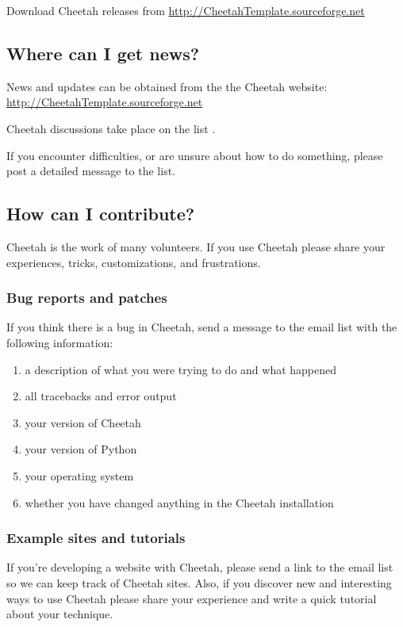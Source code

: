 Download Cheetah releases from
\url{http://CheetahTemplate.sourceforge.net}

\subsection{Where can I get news?}
\label{intro.news}

News and updates can be obtained from the the Cheetah website:
\url{http://CheetahTemplate.sourceforge.net}

Cheetah discussions take place on the list
.

If you encounter difficulties, or are unsure about how to do something,
please post a detailed message to the list.

\subsection{How can I contribute?}
\label{intro.contribute}

Cheetah is the work of many volunteers.  If you use Cheetah please share your
experiences, tricks, customizations, and frustrations.

\subsubsection{Bug reports and patches}

If you think there is a bug in Cheetah, send a message to the email list
with the following information:

\begin{enumerate}
\item a description of what you were trying to do and what happened
\item all tracebacks and error output
\item your version of Cheetah
\item your version of Python
\item your operating system
\item whether you have changed anything in the Cheetah installation
\end{enumerate}

\subsubsection{Example sites and tutorials}
If you're developing a website with Cheetah, please send a link to the
email list so we can keep track of Cheetah sites.  Also, if you discover
new and interesting ways to use Cheetah please share your experience and
write a quick tutorial about your technique.

